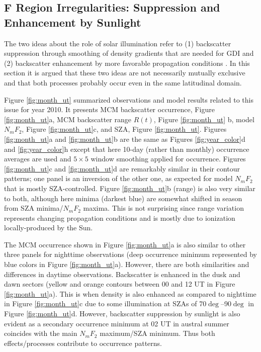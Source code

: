\subsection{\(\mathbf{F}\) Region Irregularities: Suppression and Enhancement by Sunlight}

The two ideas about the role of solar illumination refer to (1) backscatter suppression through smoothing of density gradients that are needed for GDI \citep{Ruohoniemi1997,Koustov2004} and (2) backscatter enhancement by more favorable propagation conditions \citep{Bristow2011,Koustov2014}. In this section it is argued that these two ideas are not necessarily mutually exclusive and that both processes probably occur even in the same latitudinal domain.

Figure \ref{fig:month_ut} summarized observations and model results related to this issue for year 2010. It presents MCM backscatter occurrence, Figure \ref{fig:month_ut}a, MCM backscatter range \(R(t)\), Figure \ref{fig:month_ut} b, model \(N_mF_2\), Figure \ref{fig:month_ut}c, and SZA, Figure \ref{fig:month_ut}. Figures \ref{fig:month_ut}a and \ref{fig:month_ut}b are the same as Figures \ref{fig:year_color}d and \ref{fig:year_color}h except that here 10-day (rather than monthly) occurrence averages are used and \(5\times5\) window smoothing applied for occurrence. Figures \ref{fig:month_ut}c and \ref{fig:month_ut}d are remarkably similar in their contour patterns; one panel is an inversion of the other one, as expected for model \(N_mF_2\) that is mostly SZA-controlled.  Figure \ref{fig:month_ut}b (range) is also very similar to both, although here minima (darkest blue) are somewhat shifted in season from SZA minima/\(N_mF_2\) maxima. This is not surprising since range variation represents changing propagation conditions and is mostly due to ionization locally-produced by the Sun.

The MCM occurrence shown in Figure \ref{fig:month_ut}a is also similar to other three panels for nighttime observations (deep occurrence minimum represented by blue colors in Figure \ref{fig:month_ut}a). However, there are both similarities and differences in daytime observations. Backscatter is enhanced in the dusk and dawn sectors (yellow and orange contours between 00 and 12 UT in Figure \ref{fig:month_ut}a). This is when density is also enhanced as compared to nighttime in Figure \ref{fig:month_ut}c due to some illumination at SZAs of 70\(\deg\)--90\(\deg\) in Figure \ref{fig:month_ut}d. However, backscatter suppression by sunlight is also evident as a secondary occurrence minimum at 02 UT in austral summer coincides with the main \(N_mF_2\) maximum/SZA minimum. Thus both effects/processes contribute to occurrence patterns.

